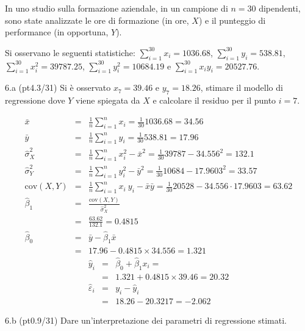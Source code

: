 \documentclass[
  10pt,
]{article}
\begin{document}
In uno studio sulla formazione aziendale, in un campione di \(n=30\) dipendenti, sono state analizzate le ore di formazione (in ore, \(X\)) e il punteggio di performance (in opportuna, \(Y\)).

Si osservano le seguenti statistiche:
\(\sum_{i=1}^{30}x_i=1036.68\), \(\sum_{i=1}^{30}y_i=538.81\),
\(\sum_{i=1}^{30}x_i^2=39787.25\), \(\sum_{i=1}^{30}y_i^2=10684.19\) e \(\sum_{i=1}^{30}x_iy_i=20527.76\).

6.a (pt\hspace{.1em}4.3/31) Si è osservato \(x_7=39.46\) e \(y_7=18.26\), stimare il modello di regressione dove \(Y\) viene spiegata da \(X\) e calcolare il residuo per il punto \(i=7\).

\begin{sol}
\begin{eqnarray*}
           \bar x &=&\frac 1 n\sum_{i=1}^n x_i = \frac {1}{ 30 }  1036.68 =  34.56 \\
           \bar y &=&\frac 1 n\sum_{i=1}^n y_i = \frac {1}{ 30 }  538.81 =  17.96 \\
           \hat\sigma_X^2&=&\frac 1 n\sum_{i=1}^n x_i^2-\bar x^2=\frac {1}{ 30 }  39787  - 34.556 ^2= 132.1 \\
           \hat\sigma_Y^2&=&\frac 1 n\sum_{i=1}^n y_i^2-\bar y^2=\frac {1}{ 30 }  10684  - 17.9603 ^2= 33.57 \\
           \text{cov}(X,Y)&=&\frac 1 n\sum_{i=1}^n x_i~y_i-\bar x\bar y=\frac {1}{ 30 }  20528 - 34.556 \cdot 17.9603 = 63.62 \\
           \hat\beta_1 &=& \frac{\text{cov}(X,Y)}{\hat\sigma_X^2} \\
                    &=& \frac{ 63.62 }{ 132.1 }  =  0.4815 \\
           \hat\beta_0 &=& \bar y - \hat\beta_1 \bar x\\
                    &=&  17.96 - 0.4815 \times  34.556 = 1.321 
         \end{eqnarray*}\begin{eqnarray*}
\hat y_i &=&\hat\beta_0+\hat\beta_1 x_i=\\ 
&=& 1.321 + 0.4815 \times 39.46 = 20.32 \\ 
\hat \varepsilon_i &=& y_i-\hat y_i\\ 
&=& 18.26 - 20.3217 = -2.062  
\end{eqnarray*}

\end{sol}

6.b (pt\hspace{.1em}0.9/31) Dare un'interpretazione dei parametri di regressione stimati.
\end{document}
